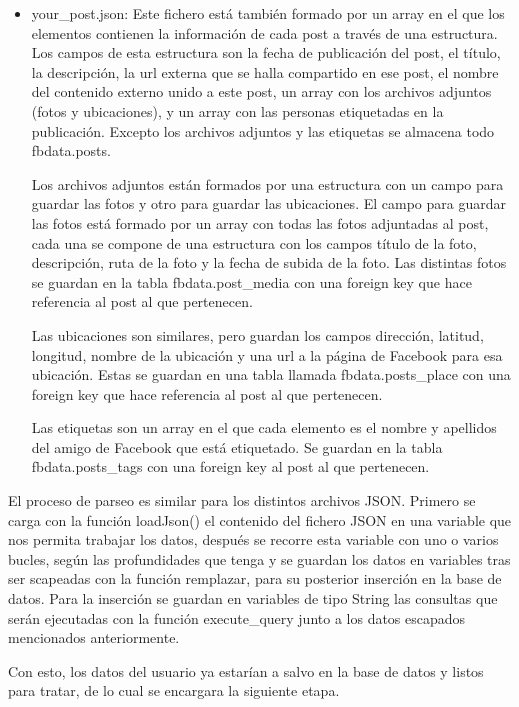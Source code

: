 \begin{itemize}
		\item your\_post.json: Este fichero está también formado por un array en el que los elementos contienen la información de cada post a través de una estructura. Los campos de esta estructura son la fecha de publicación del post, el título, la descripción, la url externa que se halla compartido en ese post, el nombre del contenido externo unido a este post, un array con los archivos adjuntos (fotos y ubicaciones), y un array con las personas etiquetadas en la publicación. Excepto los archivos adjuntos y las etiquetas se almacena todo fbdata.posts.
	
		Los archivos adjuntos están formados por una estructura con un campo para guardar las fotos y otro para guardar las ubicaciones. El campo para guardar las fotos está formado por un array con todas las fotos adjuntadas al post, cada una se compone de una estructura con los campos título de la foto, descripción, ruta de la foto y la fecha de subida de la foto. Las distintas fotos se guardan en la tabla fbdata.post\_media con una foreign key que hace referencia al post al que pertenecen.
		
		Las ubicaciones son similares, pero guardan los campos dirección, latitud, longitud, nombre de la ubicación y una url a la página de Facebook para esa ubicación. Estas se guardan en una tabla llamada fbdata.posts\_place con una foreign key que hace referencia al post al que pertenecen.
		
		Las etiquetas son un array en el que cada elemento es el nombre y apellidos del amigo de Facebook que está etiquetado. Se guardan en la tabla fbdata.posts\_tags con una foreign key al post al que pertenecen.
	
\end{itemize}


El proceso de parseo es similar para los distintos archivos JSON. Primero se carga con la función loadJson() el contenido del fichero JSON en una variable que nos permita trabajar los datos, después se recorre esta variable con uno o varios bucles, según las profundidades que tenga y se guardan los datos en variables tras ser scapeadas con la función remplazar, para su posterior inserción en la base de datos.
Para la inserción se guardan en variables de tipo String las consultas que serán ejecutadas con la función execute\_query junto a los datos escapados mencionados anteriormente. 

Con esto, los datos del usuario ya estarían a salvo en la base de datos y listos para tratar, de lo cual se encargara la siguiente etapa.


